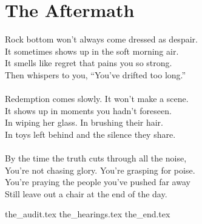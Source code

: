 \part{The Aftermath}

\vfill

\begin{flushright}
    \Large
    Rock bottom won’t always come dressed as despair.\\
    It sometimes shows up in the soft morning air.\\
    It smells like regret that pains you so strong.\\
    Then whispers to you, ``You’ve drifted too long.''\\
    \ \\
    Redemption comes slowly. It won’t make a scene.\\
    It shows up in moments you hadn’t foreseen.\\
    In wiping her glass. In brushing their hair.\\
    In toys left behind and the silence they share.\\
    \ \\
    By the time the truth cuts through all the noise,\\
    You’re not chasing glory. You’re grasping for poise.\\
    You're praying the people you've pushed far away\\
    Still leave out a chair at the end of the day.\\
\end{flushright}

{the_audit.tex}
{the_hearings.tex}
{the_end.tex}